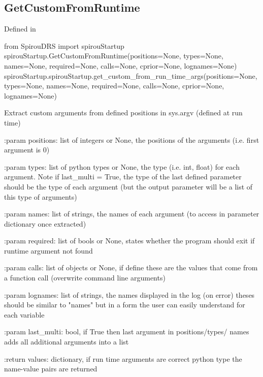 \noindent\begin{minipage}{\textwidth}
\subsection{GetCustomFromRuntime}

Defined in \spirouStartup{}

\begin{pythonbox}
from SpirouDRS import spirouStartup
spirouStartup.GetCustomFromRuntime(positions=None, types=None, names=None,
                                   required=None, calls=None, cprior=None,
                                   lognames=None)
spirouStartup.spirouStartup.get_custom_from_run_time_args(positions=None, types=None, names=None,
                                  required=None, calls=None, cprior=None,
                                  lognames=None)
\end{pythonbox}

\begin{pythondocstring}
Extract custom arguments from defined positions in sys.argv (defined at
run time)

:param positions: list of integers or None, the positions of the arguments
                  (i.e. first argument is 0)

:param types: list of python types or None, the type (i.e. int, float) for
              each argument. Note if last_multi = True, the type of the
              last defined parameter should be the type of each argument
              (but the output parameter will be a list of this type of
              arguments)

:param names: list of strings, the names of each argument (to access in
              parameter dictionary once extracted)

:param required: list of bools or None, states whether the program
                 should exit if runtime argument not found

:param calls: list of objects or None, if define these are the values that
              come from a function call (overwrite command line arguments)

:param lognames: list of strings, the names displayed in the log (on error)
                 theses should be similar to "names" but in a form the
                 user can easily understand for each variable

:param last_multi: bool, if True then last argument in positions/types/
                   names adds all additional arguments into a list

:return values: dictionary, if run time arguments are correct python type
                the name-value pairs are returned
\end{pythondocstring}
\end{minipage}

